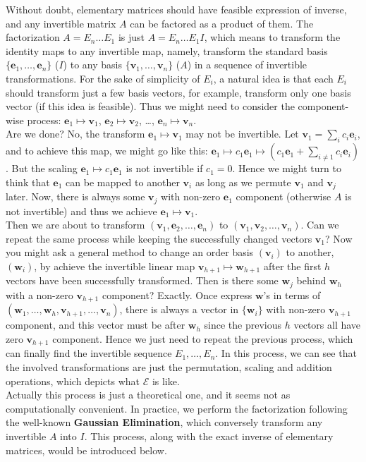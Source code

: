 \documentclass{article}
\begin{document}
\begin{Rmk}{}
    Without doubt, elementary matrices should have feasible expression of inverse, and any invertible matrix $A$ can be factored as a product of them. The factorization $A = E_n\dots E_1$ is just $A = E_n\dots E_1 I$, which means to transform the identity maps to any invertible map, namely, transform the standard basis $\{\pmb{e}_1, \dots, \pmb{e}_n\}$ ($I$) to any basis $\{\pmb{v}_1, \dots, \pmb{v}_n\}$ ($A$) in a sequence of invertible transformations. For the sake of simplicity of $E_i$, a natural idea is that each $E_i$ should transform just a few basis vectors, for example, transform only one basis vector (if this idea is feasible). Thus we might need to consider the component-wise process: $\pmb{e}_1\mapsto \pmb{v}_1$, $\pmb{e}_2\mapsto \pmb{v}_2$, \dots, $\pmb{e}_n\mapsto \pmb{v}_n$.\\
    Are we done? No, the transform $\pmb{e}_1\mapsto \pmb{v}_1$ may not be invertible. Let $\pmb{v}_1 = \sum_{i} c_i\pmb{e}_i$, and to achieve this map, we might go like this: $\pmb{e}_1\mapsto c_1\pmb{e}_1\mapsto \left(c_1\pmb{e}_1+\sum_{i\neq 1} c_i\pmb{e}_i\right)$. But the scaling $\pmb{e}_1\mapsto c_1\pmb{e}_1$ is not invertible if $c_1 = 0$. Hence we might turn to think that $\pmb{e}_1$ can be mapped to another $\pmb{v}_i$ as long as we permute $\pmb{v}_1$ and $\pmb{v}_j$ later. Now, there is always some $\pmb{v}_j$ with non-zero $\pmb{e}_1$ component (otherwise $A$ is not invertible) and thus we achieve $\pmb{e}_1\mapsto \pmb{v}_1$.\\
    Then we are about to transform $(\pmb{v}_1, \pmb{e}_2, \dots, \pmb{e}_n)$ to $(\pmb{v}_1, \pmb{v}_2, \dots, \pmb{v}_n)$. Can we repeat the same process while keeping the successfully changed vectors $\pmb{v}_1$? Now you might ask a general method to change an order basis $(\pmb{v}_i)$ to another, $(\pmb{w}_i)$, by achieve the invertible linear map $\pmb{v}_{h+1}\mapsto \pmb{w}_{h+1}$ after the first $h$ vectors have been successfully transformed. Then is there some $\pmb{w}_j$ behind $\pmb{w}_h$ with a non-zero $\pmb{v}_{h+1}$ component? Exactly. Once express $\pmb{w}$'s in terms of $(\pmb{w}_1, \dots, \pmb{w}_h, \pmb{v}_{h+1}, \dots, \pmb{v}_n)$, there is always a vector in $\{\pmb{w}_i\}$ with non-zero $\pmb{v}_{h+1}$ component, and this vector must be after $\pmb{w}_h$ since the previous $h$ vectors all have zero $\pmb{v}_{h+1}$ component. Hence we just need to repeat the previous process, which can finally find the invertible sequence $E_1, \dots, E_n$. In this process, we can see that the involved transformations are just the permutation, scaling and addition operations, which depicts what $\mathcal{E}$ is like.\\
    Actually this process is just a theoretical one, and it seems not as computationally convenient. In practice, we perform the factorization following the well-known \textbf{Gaussian Elimination}, which conversely transform any invertible $A$ into $I$. This process, along with the exact inverse of elementary matrices, would be introduced below. 
\end{Rmk}
\end{document}
